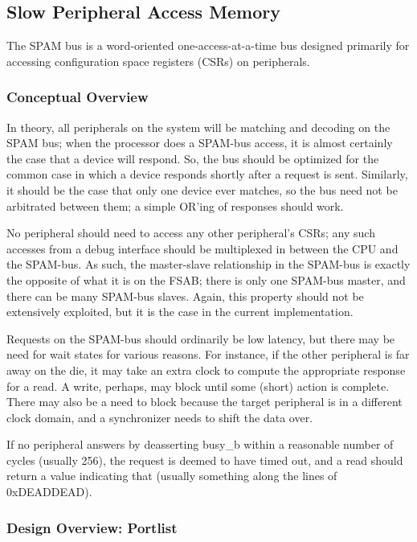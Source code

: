 \documentclass[10pt,twocolumn]{article}
\begin{document}
\subsection{Slow Peripheral Access Memory}

The SPAM bus is a word-oriented one-access-at-a-time bus designed primarily
for accessing configuration space registers (CSRs) on peripherals.

\subsubsection{Conceptual Overview}

In theory, all peripherals on the system will be matching and decoding on
the SPAM bus; when the processor does a SPAM-bus access, it is almost
certainly the case that a device will respond.  So, the bus should be
optimized for the common case in which a device responds shortly after a
request is sent.  Similarly, it should be the case that only one device ever
matches, so the bus need not be arbitrated between them; a simple OR'ing of
responses should work.

No peripheral should need to access any other peripheral's CSRs; any such
accesses from a debug interface should be multiplexed in between the CPU and
the SPAM-bus.  As such, the master-slave relationship in the SPAM-bus is
exactly the opposite of what it is on the FSAB; there is only one SPAM-bus
master, and there can be many SPAM-bus slaves.  Again, this property should
not be extensively exploited, but it is the case in the current
implementation.

Requests on the SPAM-bus should ordinarily be low latency, but there may be
need for wait states for various reasons.  For instance, if the other
peripheral is far away on the die, it may take an extra clock to compute the
appropriate response for a read.  A write, perhaps, may block until some
(short) action is complete.  There may also be a need to block because the
target peripheral is in a different clock domain, and a synchronizer needs
to shift the data over.

If no peripheral answers by deasserting busy\_b within a reasonable number
of cycles (usually 256), the request is deemed to have timed out, and a read
should return a value indicating that (usually something along the lines of
0xDEADDEAD).

\subsubsection{Design Overview: Portlist}
\end{document}
